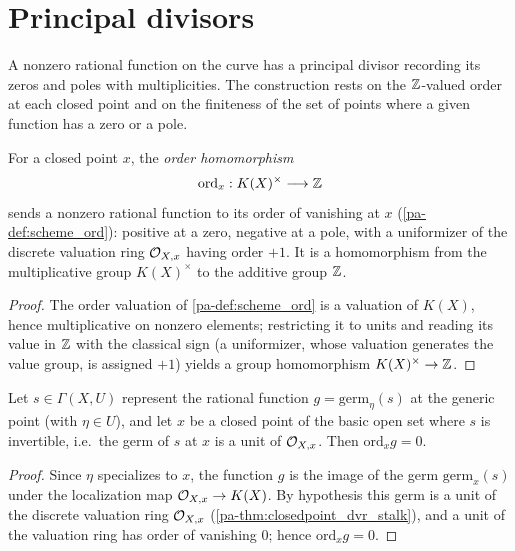 \section{Principal divisors}

A nonzero rational function on the curve has a principal divisor recording its zeros and poles with
multiplicities. The construction rests on the \(\mathbb{Z}\)-valued order at each closed point and on the
finiteness of the set of points where a given function has a zero or a pole.

\begin{definition}
  \label{pa-def:scheme_ordZ}
  \leanok

  For a closed point \(x\), the \emph{order homomorphism}
  \[
    \mathrm{ord}_x : K(X)^\times \longrightarrow \mathbb{Z}
  \]
  sends a nonzero rational function to its order of vanishing at \(x\) (\ref{pa-def:scheme_ord}):
  positive at a zero, negative at a pole, with a uniformizer of the discrete valuation ring
  \(\mathcal{O}_{X,x}\) having order \(+1\). It is a homomorphism from the multiplicative group
  \(K(X)^\times\) to the additive group \(\mathbb{Z}\).
\end{definition}
\begin{proof}
  \leanok
  The order valuation of \ref{pa-def:scheme_ord} is a valuation of \(K(X)\), hence multiplicative on
  nonzero elements; restricting it to units and reading its value in \(\mathbb{Z}\) with the classical sign
  (a uniformizer, whose valuation generates the value group, is assigned \(+1\)) yields a group
  homomorphism \(K(X)^\times \to \mathbb{Z}\).
\end{proof}

\begin{lemma}
  \label{pa-lem:ord_eq_one_of_mem_basicOpen}
  \leanok

  Let \(s \in \Gamma(X, U)\) represent the rational function \(g = \mathrm{germ}_\eta(s)\) at the
  generic point (with \(\eta \in U\)), and let \(x\) be a closed point of the basic open set where
  \(s\) is invertible, i.e.\ the germ of \(s\) at \(x\) is a unit of \(\mathcal{O}_{X,x}\). Then
  \(\mathrm{ord}_x g = 0\).
\end{lemma}
\begin{proof}
  \leanok
  Since \(\eta\) specializes to \(x\), the function \(g\) is the image of the germ \(\mathrm{germ}_x(s)\)
  under the localization map \(\mathcal{O}_{X,x} \to K(X)\). By hypothesis this germ is a unit of the
  discrete valuation ring \(\mathcal{O}_{X,x}\) (\ref{pa-thm:closedpoint_dvr_stalk}), and a unit of the
  valuation ring has order of vanishing \(0\); hence \(\mathrm{ord}_x g = 0\).
\end{proof}

